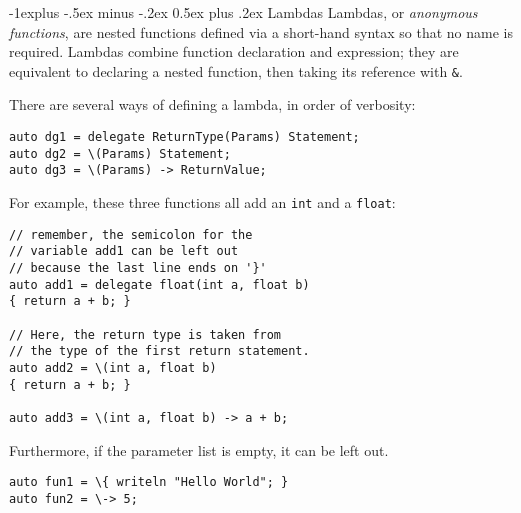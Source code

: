 \documentclass[a4paper,10pt,landscape]{article}
\makeatletter
\newenvironment{segment}[1]
{\begin{mdframed}[roundcorner=5pt]\subsection{#1}}
{\end{mdframed}\vspace{2pt plus 5pt}}
\renewcommand{\subsection}{\@startsection{subsection}{2}{0mm}%
			      {-1explus -.5ex minus -.2ex}%
			      {0.5ex plus .2ex}%
			      {\normalfont\normalsize\bfseries}}
\makeatother
\begin{document}
\begin{multicols}{3}
\begin{segment}{Lambdas}
Lambdas, or \emph{anonymous functions}, are nested functions defined via a short-hand syntax
so that no name is required. Lambdas combine function declaration and expression; they are
equivalent to declaring a nested function, then taking its reference with \texttt{\&}.

There are several ways of defining a lambda, in order of verbosity:

\begin{lstlisting}
auto dg1 = delegate ReturnType(Params) Statement;
auto dg2 = \(Params) Statement;
auto dg3 = \(Params) -> ReturnValue;
\end{lstlisting}

For example, these three functions all add an \texttt{int} and a \texttt{float}:

\begin{lstlisting}
// remember, the semicolon for the
// variable add1 can be left out
// because the last line ends on '}'
auto add1 = delegate float(int a, float b)
{ return a + b; }

// Here, the return type is taken from
// the type of the first return statement.
auto add2 = \(int a, float b)
{ return a + b; }

auto add3 = \(int a, float b) -> a + b;
\end{lstlisting}

Furthermore, if the parameter list is empty, it can be left out.

\begin{lstlisting}
auto fun1 = \{ writeln "Hello World"; }
auto fun2 = \-> 5;
\end{lstlisting}

\end{segment}

\end{multicols}
\end{document}
